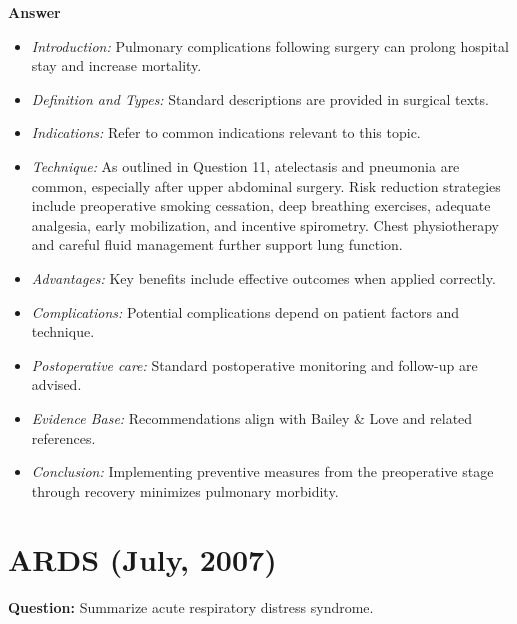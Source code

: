 \documentclass{article}
\begin{document}
\textbf{Answer}
\begin{itemize}

\item \emph{Introduction:} Pulmonary complications following surgery can prolong hospital stay and increase mortality.
\item \emph{Definition and Types:} Standard descriptions are provided in surgical texts.
\item \emph{Indications:} Refer to common indications relevant to this topic.

\item \emph{Technique:} As outlined in Question 11, atelectasis and pneumonia are common, especially after upper abdominal surgery. Risk reduction strategies include preoperative smoking cessation, deep breathing exercises, adequate analgesia, early mobilization, and incentive spirometry. Chest physiotherapy and careful fluid management further support lung function.
\item \emph{Advantages:} Key benefits include effective outcomes when applied correctly.
\item \emph{Complications:} Potential complications depend on patient factors and technique.
\item \emph{Postoperative care:} Standard postoperative monitoring and follow-up are advised.
\item \emph{Evidence Base:} Recommendations align with Bailey \& Love and related references.

\item \emph{Conclusion:} Implementing preventive measures from the preoperative stage through recovery minimizes pulmonary morbidity.


\end{itemize}

\section{ARDS (July, 2007)}

\textbf{Question:} Summarize acute respiratory distress syndrome.
\end{document}
